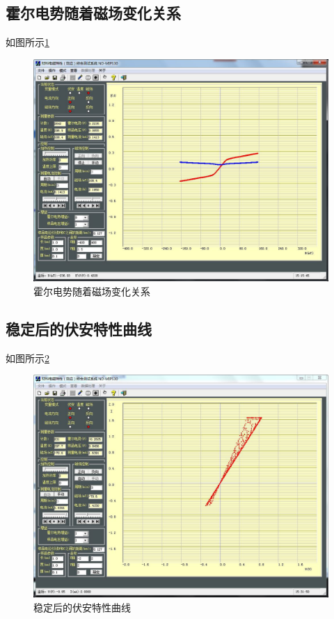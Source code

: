 \documentclass{buaaemp}
\begin{document}
\subsection{霍尔电势随着磁场变化关系}
如图所示\ref{fig:potential_B}
\begin{figure}
    \centering
    \includegraphics[width=\linewidth]{image/temp.jpg}
    \caption{霍尔电势随着磁场变化关系}
    \label{fig:potential_B}
\end{figure}

\subsection{稳定后的伏安特性曲线}
如图所示\ref{fig:VA}
\begin{figure}
    \centering
    \includegraphics[width=\linewidth]{image/VA.jpg}
    \caption{稳定后的伏安特性曲线}
    \label{fig:VA}
\end{figure}
\end{document}
